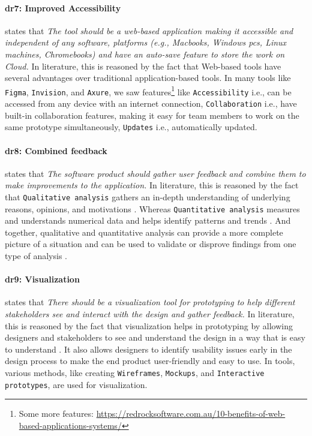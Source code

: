 \paragraph{\ac{dr}7: Improved Accessibility} states that \textit{The tool should be a web-based application making it accessible and independent of any software, platforms (e.g., Macbooks, Windows \ac{pc}s, Linux machines, Chromebooks) and have an auto-save feature to store the work on Cloud.}
In literature, this is reasoned by the fact that Web-based tools have several advantages \cite{misc:cloud} over traditional application-based tools.
In many tools like \texttt{Figma}, \texttt{Invision}, and \texttt{Axure}, we saw features\footnote{Some more features: \url{https://redrocksoftware.com.au/10-benefits-of-web-based-applications-systems/}} like \texttt{Accessibility} i.e., can be accessed from any device with an internet connection, \texttt{Collaboration} i.e., have built-in collaboration features, making it easy for team members to work on the same prototype simultaneously, \texttt{Updates} i.e., automatically updated.

\paragraph{\ac{dr}8: Combined feedback} states that \textit{The software product should gather user feedback and combine them to make improvements to the application.} 
In literature, this is reasoned by the fact that \texttt{Qualitative analysis} gathers an in-depth understanding of underlying reasons, opinions, and motivations \cite{misc:dsr:mayring}.
Whereas \texttt{Quantitative analysis} measures and understands numerical data and helps identify patterns and trends \cite{article:qqa:young}.
And together, qualitative and quantitative analysis can provide a more complete picture of a situation and can be used to validate or disprove findings from one type of analysis \cite{article:qq:helena}.

\paragraph{\ac{dr}9: Visualization} states that \textit{There should be a visualization tool for prototyping to help different stakeholders see and interact with the design and gather feedback.} 
In literature, this is reasoned by the fact that visualization helps in prototyping by allowing designers and stakeholders to see and understand the design in a way that is easy to understand \cite{article:comparative:prototypes}.
It also allows designers to identify usability issues \cite{article:prototyping:gould} early in the design process to make the end product user-friendly and easy to use.
In tools, various methods, like creating \texttt{Wireframes}, \texttt{Mockups}, and \texttt{Interactive prototypes}, are used for visualization.

